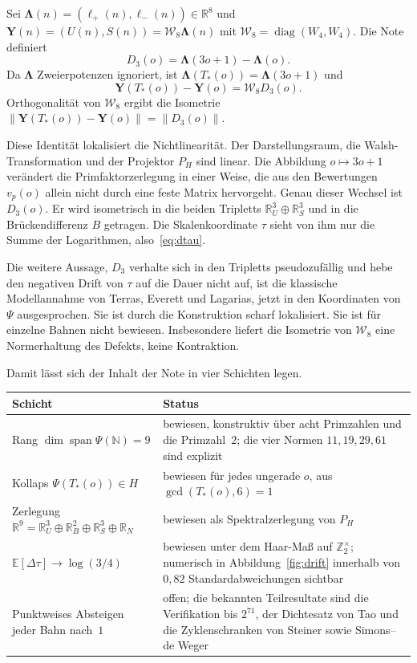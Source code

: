 \documentclass[11pt,a4paper]{article}
\theoremstyle{plain}
\theoremstyle{definition}
\newcommand{\N}{\mathbb{N}}
\newcommand{\Z}{\mathbb{Z}}
\newcommand{\R}{\mathbb{R}}
\newcommand{\E}{\mathbb{E}}
\DeclareMathOperator{\diag}{diag}
\numberwithin{equation}{section}
\begin{document}
Sei $\boldsymbol{\Lambda}(n)=(\boldsymbol{\ell}_+(n),\boldsymbol{\ell}_-(n))\in\R^8$
und $\mathbf{Y}(n)=(U(n),S(n))=\mathcal{W}_8\boldsymbol{\Lambda}(n)$ mit
$\mathcal{W}_8=\diag(W_4,W_4)$.
Die Note definiert
\begin{equation}
D_3(o)=\boldsymbol{\Lambda}(3o+1)-\boldsymbol{\Lambda}(o).
\end{equation}
Da $\boldsymbol{\Lambda}$ Zweierpotenzen ignoriert, ist
$\boldsymbol{\Lambda}(T_*(o))=\boldsymbol{\Lambda}(3o+1)$ und
\begin{equation}
\mathbf{Y}(T_*(o))-\mathbf{Y}(o)=\mathcal{W}_8 D_3(o).
\end{equation}
Orthogonalität von $\mathcal{W}_8$ ergibt die Isometrie
$\lVert\mathbf{Y}(T_*(o))-\mathbf{Y}(o)\rVert=\lVert D_3(o)\rVert$.

Diese Identität lokalisiert die Nichtlinearität.
Der Darstellungsraum, die Walsh-Transformation und der Projektor $P_H$ sind
linear.
Die Abbildung $o\mapsto 3o+1$ verändert die Primfaktorzerlegung in einer
Weise, die aus den Bewertungen $v_p(o)$ allein nicht durch eine feste Matrix
hervorgeht.
Genau dieser Wechsel ist $D_3(o)$.
Er wird isometrisch in die beiden Tripletts $\R^3_U\oplus\R^3_S$ und in die
Brückendifferenz $B$ getragen.
Die Skalenkoordinate $\tau$ sieht von ihm nur die Summe der Logarithmen,
also~\eqref{eq:dtau}.

Die weitere Aussage, $D_3$ verhalte sich in den Tripletts pseudozufällig und
hebe den negativen Drift von $\tau$ auf die Dauer nicht auf, ist die
klassische Modellannahme von Terras, Everett und Lagarias, jetzt in den
Koordinaten von $\Psi$ ausgesprochen.
Sie ist durch die Konstruktion scharf lokalisiert.
Sie ist für einzelne Bahnen nicht bewiesen.
Insbesondere liefert die Isometrie von $\mathcal{W}_8$ eine Normerhaltung des
Defekts, keine Kontraktion.

Damit lässt sich der Inhalt der Note in vier Schichten legen.

\begin{center}
\begin{tabular}{@{}p{}p{}@{}}
\toprule
Schicht & Status\\
\midrule
Rang $\dim\operatorname{span}\Psi(\N)=9$ &
bewiesen, konstruktiv über acht Primzahlen und die Primzahl~$2$;
die vier Normen $11,19,29,61$ sind explizit\\[0.4em]
Kollaps $\Psi(T_*(o))\in H$ &
bewiesen für jedes ungerade $o$, aus $\gcd(T_*(o),6)=1$\\[0.4em]
Zerlegung $\R^9=\R^3_U\oplus\R^2_B\oplus\R^3_S\oplus\R_N$ &
bewiesen als Spektralzerlegung von $P_H$\\[0.4em]
$\E[\Delta\tau]\to\log(3/4)$ &
bewiesen unter dem Haar-Maß auf $\Z_2^\times$;
numerisch in Abbildung~\ref{fig:drift} innerhalb von $0{,}82$
Standardabweichungen sichtbar\\[0.4em]
Punktweises Absteigen jeder Bahn nach~$1$ &
offen; die bekannten Teilresultate sind die Verifikation bis $2^{71}$,
der Dichtesatz von Tao und die Zyklenschranken von Steiner sowie
Simons--de Weger\\
\bottomrule
\end{tabular}
\end{center}
\end{document}

